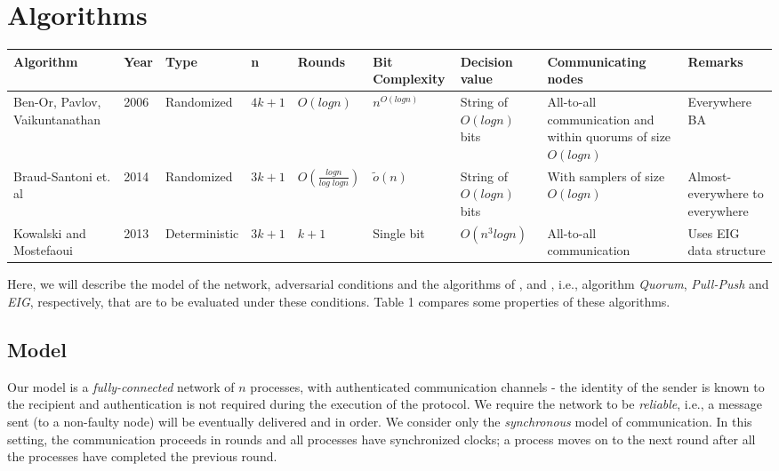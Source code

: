 ﻿\section{Algorithms}
\label{sec:algos}

\begin{table*}[t]
    \begin{tabular}{p{2cm}llllllp{2.5cm}p{2cm}}
\hline
\textbf{Algorithm} & \textbf{Year} & \textbf{Type} &\textbf{n} & \textbf{Rounds} & \textbf{Bit Complexity } &\textbf{Decision value} & \textbf{Communicating nodes}& \textbf{Remarks} \\ \hline
Ben-Or, Pavlov, Vaikuntanathan \cite{BPV06} & 2006 & Randomized & $4k + 1$ & $O(logn)$ & $n^{O(logn)}$      &String of $O(logn)$ bits &All-to-all communication and within quorums of size $O(logn)$   & Everywhere BA     \\
          Braud-Santoni et. al \cite{BGH13} & 2014 & Randomized & $3k + 1$ & $O(\frac{logn}{log\; log n})$ & $\tilde{o}(n)$      &String of $O(logn)$ bits &With samplers of size $O(logn)$  & Almost-everywhere to everywhere     \\
 Kowalski and Mostefaoui \cite{MHR14} & 2013   & Deterministic & $3k + 1$     & $k + 1$               &Single bit               & $O(n^3logn)$ &All-to-all communication & Uses EIG data structure\\ \hline
%
\end{tabular}
\end{table*}



Here, we will describe the model of the network, adversarial conditions and the algorithms of \cite{BPV06}, \cite{BGH13} and \cite{MHR14}, i.e., algorithm \textit{Quorum}, \textit{Pull-Push} and \textit{EIG}, respectively, that are to be evaluated under these conditions. Table 1 compares some properties of these algorithms.


\subsection{Model}
Our model is a \textit{fully-connected} network of $n$ processes, with authenticated communication channels - the identity of the sender is known to the recipient and authentication is not required during the execution of the protocol. We require the network to be \textit{reliable}, i.e., a message sent (to a non-faulty node) will be eventually delivered and in order. We consider only the \textit{synchronous} model of communication. In this setting, the communication proceeds in rounds and all processes have synchronized clocks; a process moves on to the next round after all the processes have completed the previous round. %

